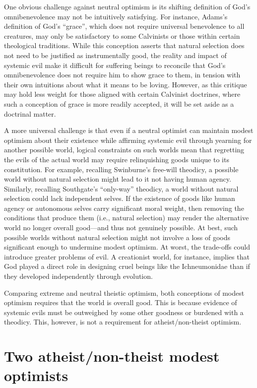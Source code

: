 One obvious challenge against neutral optimism is its shifting
definition of God's omnibenevolence may not be intuitively satisfying.
For instance, Adams's definition of God's ``grace'', which does not
require universal benevolence to all creatures, may only be satisfactory
to some Calvinists or those within certain theological traditions. While
this conception asserts that natural selection does not need to be
justified as instrumentally good, the reality and impact of systemic
evil make it difficult for suffering beings to reconcile that God's
omnibenevolence does not require him to show grace to them, in tension
with their own intuitions about what it means to be loving. However, as
this critique may hold less weight for those aligned with certain
Calvinist doctrines, where such a conception of grace is more readily
accepted, it will be set aside as a doctrinal matter.

A more universal challenge is that even if a neutral optimist can
maintain modest optimism about their existence while affirming systemic
evil through yearning for another possible world, logical constraints on
such worlds mean that regretting the evils of the actual world may
require relinquishing goods unique to its constitution. For example,
recalling Swinburne's free-will theodicy, a possible world without
natural selection might lead to it not having human agency. Similarly,
recalling Southgate's ``only-way'' theodicy, a world without natural
selection could lack independent selves. If the existence of goods like
human agency or autonomous selves carry significant moral weight, then
removing the conditions that produce them (i.e., natural selection) may
render the alternative world no longer overall good---and thus not
genuinely possible. At best, such possible worlds without natural
selection might not involve a loss of goods significant enough to
undermine modest optimism. At worst, the trade-offs could introduce
greater problems of evil. A creationist world, for instance, implies
that God played a direct role in designing cruel beings like the
Ichneumonidae than if they developed independently through evolution.

Comparing extreme and neutral theistic optimism, both conceptions of
modest optimism requires that the world is overall good. This is because
evidence of systemic evils must be outweighed by some other goodness or
burdened with a theodicy. This, however, is not a requirement for
atheist/non-theist optimism.

\section{Two atheist/non-theist modest optimists}
